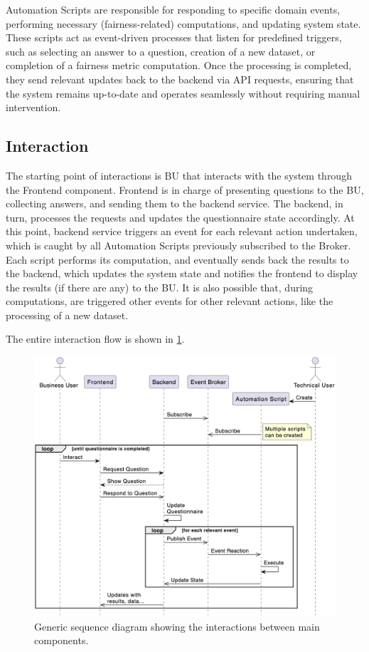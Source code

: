 \documentclass[12pt,a4paper,openright,twoside]{book}
\begin{document}
Automation Scripts are responsible for responding to specific domain events, performing necessary (fairness-related) computations, and updating system state.
%
These scripts act as event-driven processes that listen for predefined triggers, such as selecting an answer to a question, creation of a new dataset, or completion of a fairness metric computation.
%
Once the processing is completed, they send relevant updates back to the backend via \ac{API} requests, ensuring that the system remains up-to-date and operates seamlessly without requiring manual intervention.

\subsection{Interaction}
The starting point of interactions is \ac{BU} that interacts with the system through the Frontend component.
%
Frontend is in charge of presenting questions to the \ac{BU}, collecting answers, and sending them to the backend service.
%
The backend, in turn, processes the requests and updates the questionnaire state accordingly.
%
At this point, backend service triggers an event for each relevant action undertaken, which is caught by all Automation Scripts previously subscribed to the Broker.
%
Each script performs its computation, and eventually sends back the results to the backend, which updates the system state and notifies the frontend to display the results (if there are any) to the \ac{BU}.
%
It is also possible that, during computations, are triggered other events for other relevant actions, like the processing of a new dataset.

The entire interaction flow is shown in \cref{fig:sequence}.

\begin{figure}
    \centering
    \includegraphics[width=0.70\linewidth]{figures/diagrams/sequence.png}
    \caption{
        Generic sequence diagram showing the interactions between main components.
    }
    \label{fig:sequence}
\end{figure}
\end{document}
